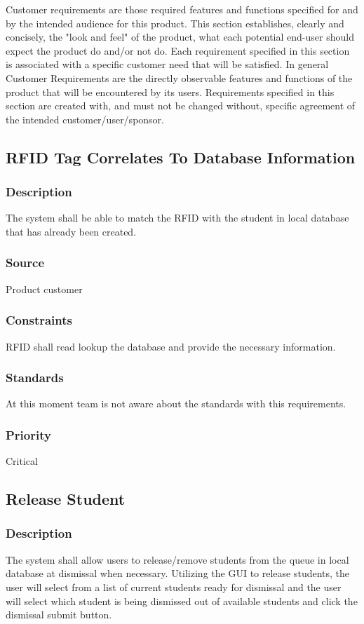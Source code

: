 \quad \quad Customer requirements are 
those required features and functions specified for and by the intended audience for 
this product. This section establishes, clearly and concisely, the "look and feel" of 
the product, what each potential end-user should expect the product do and/or not do. 
Each requirement specified in this section is associated with a specific customer need 
that will be satisfied. In general Customer Requirements are the directly observable 
features and functions of the product that will be encountered by its users. 
Requirements specified in this section are created with, and must not be changed 
without, specific agreement of the intended customer/user/sponsor.

\subsection{RFID Tag Correlates To Database Information}
\subsubsection{Description}
\quad \quad The system shall be able to match the RFID with the student in local database that 
has already been created.
\subsubsection{Source}
\quad \quad Product customer
\subsubsection{Constraints}
\quad \quad RFID shall read lookup the database and provide the necessary information.
\subsubsection{Standards}
\quad \quad At this moment team is not aware about the standards with this requirements.
\subsubsection{Priority}
\quad \quad Critical

\subsection{Release Student}
\subsubsection{Description}
\quad \quad The system shall allow users to release/remove students from the queue in local database 
at dismissal when necessary. Utilizing the GUI to release students, the user will 
select from a list of current students ready for dismissal and the user will select 
which student is being dismissed out of available students and click the dismissal 
submit button.  
